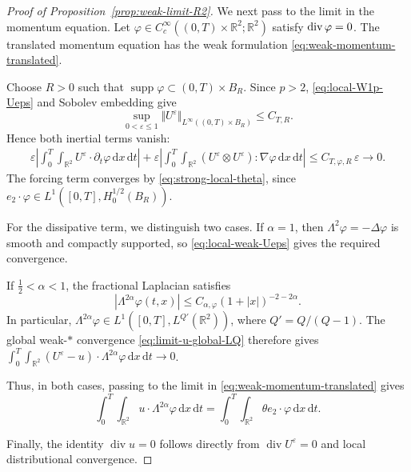 \documentclass[reqno,11pt,a4paper]{amsart}
\newcommand{\dd}{\mathrm{d}}
\renewcommand{\div}{{\rm div\,}}
\begin{document}
\begin{proof}[Proof of Proposition~\ref{prop:weak-limit-R2}]
We next pass to the limit in the momentum equation.
Let
$\varphi\in C_c^\infty((0,T)\times\mathbb R^2;\mathbb R^2)$
satisfy $\div\varphi=0$.
The translated momentum equation has the weak formulation \eqref{eq:weak-momentum-translated}.


Choose $R>0$ such that
$\operatorname{supp}\varphi\subset(0,T)\times B_R$.
Since $p>2$, \eqref{eq:local-W1p-Ueps}
and Sobolev embedding give
\[
  \sup_{0<\varepsilon\leq1}
  \Vert U^\varepsilon\Vert _{L^\infty((0,T)\times B_R)}
  \leq C_{T,R}.
\]
Hence both inertial terms vanish:
\begin{align*}
  \varepsilon
  \left|
    \int_0^T\!\int_{\mathbb R^2}
    U^\varepsilon\cdot\partial_t\varphi\,\dd x\,\dd t
  \right|
  +
  \varepsilon
  \left|
    \int_0^T\!\int_{\mathbb R^2}
    (U^\varepsilon\otimes U^\varepsilon):\nabla\varphi
    \,\dd x\,\dd t
  \right|
  \leq C_{T,\varphi,R}\,\varepsilon
  \longrightarrow0.
\end{align*}
The forcing term converges by
\eqref{eq:strong-local-theta}, since
$e_2\cdot\varphi\in L^1([0,T],H_0^{1/2}(B_R))$.

For the dissipative term, we distinguish two cases.
If $\alpha=1$, then
$\Lambda^2\varphi=-\Delta\varphi$
is smooth and compactly supported,
so \eqref{eq:local-weak-Ueps} gives the required convergence.

If $\frac12<\alpha<1$, the fractional Laplacian satisfies
\begin{equation}\label{eq:fractional-test-decay}
  |\Lambda^{2\alpha}\varphi(t,x)|
  \leq C_{\alpha,\varphi}(1+|x|)^{-2-2\alpha}.
\end{equation}
In particular,
$\Lambda^{2\alpha}\varphi
\in L^1([0,T],L^{Q'}(\mathbb R^2))$,
where $Q'=Q/(Q-1)$.
The global weak-$\ast$ convergence
\eqref{eq:limit-u-global-LQ} therefore gives $\int_0^T\!\int_{\mathbb R^2}
    (U^\varepsilon-u)\cdot\Lambda^{2\alpha}\varphi
    \,\dd x\,\dd t
  \longrightarrow0$. 

Thus, in both cases, passing to the limit in
\eqref{eq:weak-momentum-translated} gives
\begin{equation}\label{eq:fracStokes}
  \int_0^T\!\int_{\mathbb R^2}
    u\cdot\Lambda^{2\alpha}\varphi\,\dd x\,\dd t
  =
  \int_0^T\!\int_{\mathbb R^2}
    \theta e_2\cdot\varphi\,\dd x\,\dd t.
\end{equation}

Finally, the identity $\operatorname{div}u=0$ follows directly
from $\operatorname{div}U^\varepsilon=0$
and local distributional convergence.


\end{proof}
\end{document}
